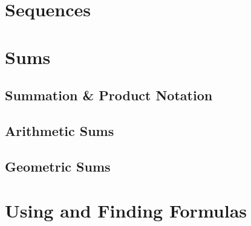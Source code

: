 \section{Sequences}
    
\clearpage

\section{Sums}

\subsection{Summation \& Product Notation}
    
\clearpage

\subsection{Arithmetic Sums}
    
\clearpage

\subsection{Geometric Sums}
    
\clearpage

\section{Using and Finding Formulas}
    
